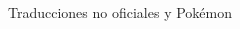 \begin{frame}{Traducciones no oficiales y Pokémon}
\begin{columns}
  \begin{column}{0.4\textwidth}
  \end{column}
\end{columns}

\end{frame}

